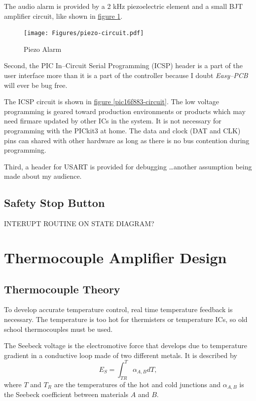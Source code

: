 \documentclass[10pt, twocolumn]{article}
\begin{document}
The audio alarm is provided by a 2 kHz piezoelectric element and a small BJT
amplifier circuit, like shown in
\hyperref[piezo-circuit]{figure \ref{piezo-circuit}}.

\begin{figure}
	\centering
	\texttt{[image: Figures/piezo-circuit.pdf]}
	\caption{Piezo Alarm}
	\label{piezo-circuit}
\end{figure}

Second, the PIC In--Circuit Serial Programming (ICSP) header is a part of the user
interface more than it is a part of the controller because I doubt \emph{Easy--PCB}
will ever be bug free.

The ICSP circuit is shown in
\hyperref[pic16f883-circuit]{figure \ref{pic16f883-circuit}}.
The low voltage programming is geared toward production environments
or products which may need firmare updated by other ICs in the system.
It is not necessary for programming with the PICkit3 at home.
The data and clock (DAT and CLK) pins can shared with other hardware
as long as there is no bus contention during programming.

Third, a header for USART is provided for debugging
\ldots another assumption being made about my audience.

\subsection{Safety Stop Button}

INTERUPT ROUTINE ON STATE DIAGRAM?

\section{Thermocouple Amplifier Design}

\subsection{Thermocouple Theory}

To develop accurate temperature control, real time temperature feedback
is necessary. The temperature is too hot for thermisters or temperature ICs,
so old school thermocouples must be used.

The Seebeck voltage is the electromotive force that develops due to temperature
gradient in a conductive loop made of two different metals. It is described by
\begin{equation}
E_{S}=\int _{TR}^{T}\alpha_{A,B}dT,
\end{equation}
where $T$ and $T_{R}$ are the temperatures of the hot and cold junctions and
$\alpha_{A,B}$ is the Seebeck coefficient between materials $A$ and $B$.
\end{document}
